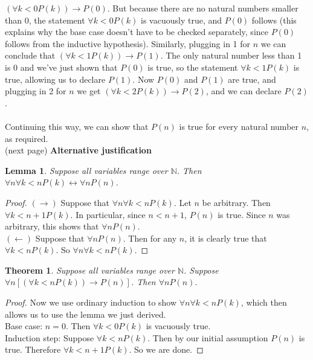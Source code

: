\documentclass{report}
\newtheorem*{theorem}{Theorem}
\newtheorem*{lemma}{Lemma}
\theoremstyle{definition}
\begin{document}
$(\forall k<0P(k))\to P(0)$. But because there are no natural numbers smaller than 0, the statement
$\forall k<0P(k)$
is vacuously true, and $P(0)$ follows (this explains why the base case doesn't have to be checked separately, 
since $P(0)$ follows from the inductive hypothesis).
Similarly, plugging in 1 for $n$ we can conclude that $(\forall k<1P(k))\to P(1)$. The only natural number less than 1 is 0 and we've just shown that $P(0)$ is true, 
so the statement $\forall k<1P(k)$ is true, allowing us to declare $P(1)$. Now $P(0)$ and $P(1)$ are true, and plugging in 2 for $n$ we get 
$(\forall k<2P(k))\to P(2)$, and we can declare $P(2)$.\\
\vspace{1mm}\\
Continuing this way, we can show that $P(n)$ is true for every natural number $n$, as required.\\
(next page)\newpage
\noindent\textbf{Alternative justification}
\begin{lemma}
Suppose all variables range over $\mathbb N$. Then 
$\forall n\forall k<nP(k)\leftrightarrow\forall nP(n)$.
\end{lemma}
\begin{proof}
$(\rightarrow)$ Suppose that $\forall n\forall k<nP(k)$. Let $n$ be arbitrary. Then $\forall k<n+1P(k)$. In particular, since
$n<n+1$, $P(n)$ is true. Since $n$ was arbitrary, this shows that $\forall nP(n)$.\\
\indent$(\leftarrow)$ Suppose that $\forall nP(n)$. Then for any $n$, it is clearly true that 
$\forall k<nP(k)$. So $\forall n\forall k<nP(k)$.
\end{proof}
\begin{theorem}
Suppose all variables range over $\mathbb N$. Suppose $\forall n[(\forall k<nP(k))\to P(n)]$. Then $\forall n P(n)$.
\end{theorem}
\begin{proof}
Now we use ordinary induction to show $\forall n\forall k<nP(k)$, which then allows us to use the lemma we just derived.\\
\indent Base case: $n=0$. Then $\forall k<0P(k)$ is vacuously true.\\
\indent Induction step: Suppose $\forall k<nP(k)$. Then by our initial assumption $P(n)$ is true. Therefore
$\forall k<n+1P(k)$. So we are done.
\end{proof}
\newpage
\end{document}
